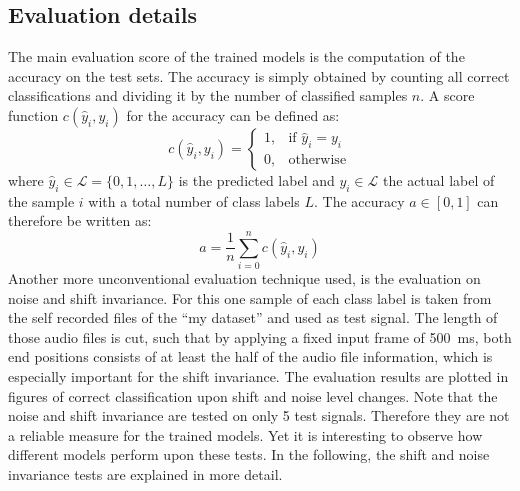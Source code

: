 \subsection{Evaluation details}\label{sec:exp_details_tb}
The main evaluation score of the trained models is the computation of the accuracy on the test sets.
The accuracy is simply obtained by counting all correct classifications and dividing it by the number of classified samples $n$.
A score function $c(\hat{y}_i, y_i)$ for the accuracy can be defined as:
\begin{equation}
  c(\hat{y}_i, y_i) = 
  \begin{cases}
    1, & \text{if } \hat{y}_i = y_i\\
    0, & \text{otherwise} 
  \end{cases}
\end{equation}
where $\hat{y}_i \in \mathcal{L} = \{0, 1, \dots, L\} $ is the predicted label and $y_i \in \mathcal{L}$ the actual label of the sample $i$ with a total number of class labels $L$.
The accuracy $a \in [0, 1]$ can therefore be written as:
\begin{equation}
  a = \frac{1}{n} \sum_{i=0}^n c(\hat{y}_i, y_i)
\end{equation}
Another more unconventional evaluation technique used, is the evaluation on noise and shift invariance.
For this one sample of each class label is taken from the self recorded files of the \enquote{my dataset} and used as test signal.
The length of those audio files is cut, such that by applying a fixed input frame of \SI{500}{\milli\second}, both end positions consists of at least the half of the audio file information, which is especially important for the shift invariance.
The evaluation results are plotted in figures of correct classification upon shift and noise level changes.
Note that the noise and shift invariance are tested on only 5 test signals.
Therefore they are not a reliable measure for the trained models.
Yet it is interesting to observe how different models perform upon these tests.
In the following, the shift and noise invariance tests are explained in more detail.



